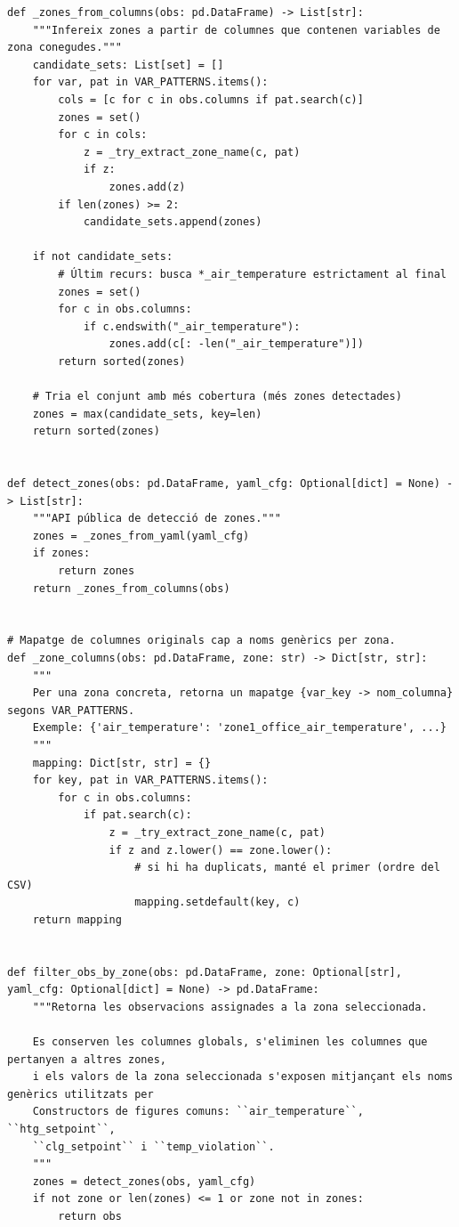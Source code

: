 \documentclass[10pt,a4paper]{article}
\begin{document}
\begin{lstlisting}[style=studioPython,caption={backend/grafics/figures\_zones.py},label={lst:backend-grafics-figures-zones-py}]
def _zones_from_columns(obs: pd.DataFrame) -> List[str]:
    """Infereix zones a partir de columnes que contenen variables de zona conegudes."""
    candidate_sets: List[set] = []
    for var, pat in VAR_PATTERNS.items():
        cols = [c for c in obs.columns if pat.search(c)]
        zones = set()
        for c in cols:
            z = _try_extract_zone_name(c, pat)
            if z:
                zones.add(z)
        if len(zones) >= 2:
            candidate_sets.append(zones)

    if not candidate_sets:
        # Últim recurs: busca *_air_temperature estrictament al final
        zones = set()
        for c in obs.columns:
            if c.endswith("_air_temperature"):
                zones.add(c[: -len("_air_temperature")])
        return sorted(zones)

    # Tria el conjunt amb més cobertura (més zones detectades)
    zones = max(candidate_sets, key=len)
    return sorted(zones)


def detect_zones(obs: pd.DataFrame, yaml_cfg: Optional[dict] = None) -> List[str]:
    """API pública de detecció de zones."""
    zones = _zones_from_yaml(yaml_cfg)
    if zones:
        return zones
    return _zones_from_columns(obs)


# Mapatge de columnes originals cap a noms genèrics per zona.
def _zone_columns(obs: pd.DataFrame, zone: str) -> Dict[str, str]:
    """
    Per una zona concreta, retorna un mapatge {var_key -> nom_columna} segons VAR_PATTERNS.
    Exemple: {'air_temperature': 'zone1_office_air_temperature', ...}
    """
    mapping: Dict[str, str] = {}
    for key, pat in VAR_PATTERNS.items():
        for c in obs.columns:
            if pat.search(c):
                z = _try_extract_zone_name(c, pat)
                if z and z.lower() == zone.lower():
                    # si hi ha duplicats, manté el primer (ordre del CSV)
                    mapping.setdefault(key, c)
    return mapping


def filter_obs_by_zone(obs: pd.DataFrame, zone: Optional[str], yaml_cfg: Optional[dict] = None) -> pd.DataFrame:
    """Retorna les observacions assignades a la zona seleccionada.

    Es conserven les columnes globals, s'eliminen les columnes que pertanyen a altres zones,
    i els valors de la zona seleccionada s'exposen mitjançant els noms genèrics utilitzats per
    Constructors de figures comuns: ``air_temperature``, ``htg_setpoint``,
    ``clg_setpoint`` i ``temp_violation``.
    """
    zones = detect_zones(obs, yaml_cfg)
    if not zone or len(zones) <= 1 or zone not in zones:
        return obs


\end{lstlisting}
\end{document}
